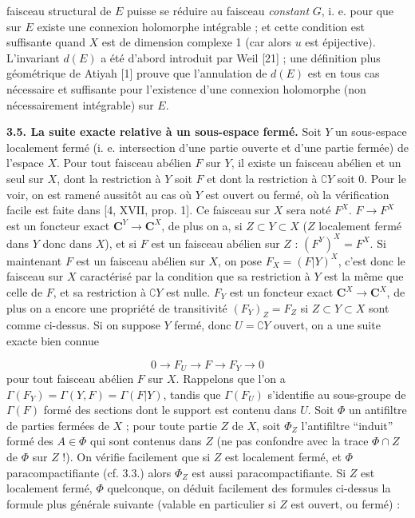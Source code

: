 
faisceau structural de $E$ puisse se réduire au faisceau \textit{constant}
$G$, i. e. pour que sur $E$ existe une connexion holomorphe intégrable ; et
cette condition est suffisante quand $X$ est de dimension complexe 1 (car
alors $u$ est épijective). L'invariant $d(E)$ a été d'abord introduit par
Weil [21] ; une définition plus géométrique de Atiyah [1] prouve que
l'annulation de $d(E)$ est en tous cas nécessaire et suffisante pour
l'existence d'une connexion holomorphe (non nécessairement intégrable) sur
$E$.

\indent\textbf{3.5. La suite exacte relative à un sous-espace fermé.} Soit $Y$ un
sous-espace localement fermé (i. e. intersection d'une partie ouverte et d'une
partie fermée) de l'espace $X$. Pour tout faisceau abélien $F$ sur $Y$, il
existe un faisceau abélien et un seul sur $X$, dont la restriction à $Y$ soit
$F$ et dont la restriction à $\complement Y$ soit 0. Pour le voir, on est ramené aussitôt
au cas où $Y$ est ouvert ou fermé, où la vérification facile est faite dans
[4, XVII, prop. 1].
Ce faisceau sur $X$ sera noté $F^X$. $F\to F^X$ est un foncteur exact
$\mathbf C^Y\to \mathbf C^X$, de plus on a, si $Z\subset Y\subset X$ ($Z$
localement fermé dans $Y$ donc dans $X$), et si $F$ est un faisceau abélien
sur $Z$ :
$(F^Y)^X=F^X$.
Si maintenant $F$ est un faisceau abélien sur $X$, on pose
$F_X=(F\vert Y)^X$, c'est donc le faisceau sur $X$ caractérisé par la
condition que sa restriction à $Y$ est la même que celle de $F$, et sa
restriction à $\complement Y$ est nulle. $F_Y$ est un foncteur exact
$\mathbf C^X\to \mathbf C^X$, de plus on a encore une propriété de transitivité
$(F_Y)_Z=F_Z$
si $Z\subset Y\subset X$ sont comme ci-dessus. Si on suppose $Y$ fermé, donc
$U=\complement Y$ ouvert, on a une suite exacte bien connue

\[
0\to F_U\to F\to F_Y\to0
\]
pour tout faisceau abélien $F$ sur $X$. Rappelons que l'on a
$\Gamma(F_Y)=\Gamma(Y,F)=\Gamma(F\vert Y)$, tandis que $\Gamma(F_U)$
s'identifie au sous-groupe de $\Gamma(F)$ formé des sections dont le support
est contenu dans $U$.
Soit $\Phi$ un antifiltre de parties fermées de $X$ ; pour toute partie $Z$
de $X$, soit $\Phi_Z$ l'antifiltre ``induit'' formé des $A\in\Phi$ qui
sont contenus dans $Z$ (ne pas confondre avec la trace $\Phi\cap Z$ de $\Phi$
sur $Z$ !). On vérifie facilement que si $Z$ est localement fermé, et $\Phi$
paracompactifiante (cf. 3.3.) alors $\Phi_Z$ est aussi paracompactifiante. Si
$Z$ est localement fermé, $\Phi$ quelconque, on déduit facilement des formules
ci-dessus la formule plus générale suivante (valable en particulier si $Z$
est ouvert, ou fermé) :

